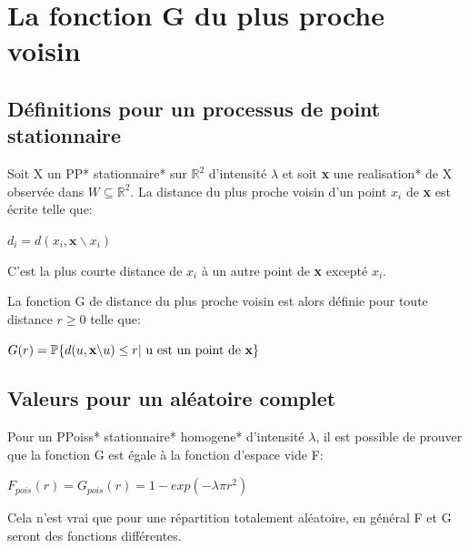\documentclass[stage2a]{tnreport}
\begin{document}

\section{La fonction G du plus proche voisin}

\subsection{Définitions pour un processus de point stationnaire}

Soit X un \gls{PP}* \gls{stationnaire}* sur \begin{math} \mathbb{R}^2\end{math} d'intensité \begin{math}\lambda\end{math} et soit \textbf{x} une \gls{realisation}* de X observée dans \begin{math} W \subseteq \mathbb{R}^2\end{math}. La distance du plus proche voisin d'un point \begin{math}x_i\end{math} de \textbf{x} est écrite telle que:
\begin{center}\begin{math} d_i = d(x_i,\textbf{x}\backslash x_i ) \end{math}\end{center}
C'est la plus courte distance de \begin{math} x_i \end{math} à un autre point de \textbf{x} excepté \begin{math} x_i \end{math}.

La fonction G de distance du plus proche voisin est alors définie pour toute distance \begin{math} r \geq 0 \end{math} telle que:
\begin{center}\begin{math} G(r) = \mathbb{P}\{ d(u,\textbf{x}\backslash u) \leq r | \text{ u est un point de \textbf{x}} \} \end{math}\end{center}


\subsection{Valeurs pour un aléatoire complet}
Pour un \gls{PPoiss}* \gls{stationnaire}* \gls{homogene}* d'intensité \begin{math}\lambda\end{math}, il est possible de prouver que la fonction G est égale à la fonction d'espace vide F: 
\begin{center}\begin{math} F_{pois}(r) = G_{pois}(r) = 1 - exp(-\lambda \pi r^2) \end{math}\end{center}
Cela n'est vrai que pour une répartition totalement aléatoire, en général F et G seront des fonctions différentes.
\end{document}
